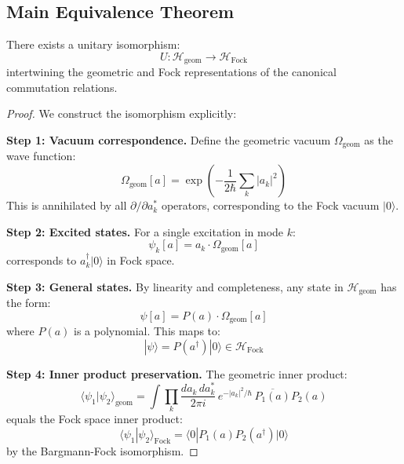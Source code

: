 \subsection{Main Equivalence Theorem}

\begin{theorem}
There exists a unitary isomorphism:
\begin{equation}
    U : \mathcal{H}_{\text{geom}} \to \mathcal{H}_{\text{Fock}}
\end{equation}
intertwining the geometric and Fock representations of the canonical commutation relations.
\end{theorem}

\begin{proof}
We construct the isomorphism explicitly:

\textbf{Step 1: Vacuum correspondence.} Define the geometric vacuum $\Omega_{\text{geom}}$ as the wave function:
\begin{equation}
    \Omega_{\text{geom}}[a] = \exp\left(-\frac{1}{2\hbar} \sum_k |a_k|^2\right)
\end{equation}
This is annihilated by all $\partial/\partial a_k^*$ operators, corresponding to the Fock vacuum $|0\rangle$.

\textbf{Step 2: Excited states.} For a single excitation in mode $k$:
\begin{equation}
    \psi_k[a] = a_k \cdot \Omega_{\text{geom}}[a]
\end{equation}
corresponds to $a_k^\dagger |0\rangle$ in Fock space.

\textbf{Step 3: General states.} By linearity and completeness, any state in $\mathcal{H}_{\text{geom}}$ has the form:
\begin{equation}
    \psi[a] = P(a) \cdot \Omega_{\text{geom}}[a]
\end{equation}
where $P(a)$ is a polynomial. This maps to:
\begin{equation}
    |\psi\rangle = P(a^\dagger) |0\rangle \in \mathcal{H}_{\text{Fock}}
\end{equation}

\textbf{Step 4: Inner product preservation.} The geometric inner product:
\begin{equation}
    \langle \psi_1 | \psi_2 \rangle_{\text{geom}} = \int \prod_k \frac{da_k \, da_k^*}{2\pi i} \, e^{-|a_k|^2/\hbar} \, \overline{P_1(a)} P_2(a)
\end{equation}
equals the Fock space inner product:
\begin{equation}
    \langle \psi_1 | \psi_2 \rangle_{\text{Fock}} = \langle 0 | P_1(a) P_2(a^\dagger) |0\rangle
\end{equation}
by the Bargmann-Fock isomorphism.
\end{proof}

